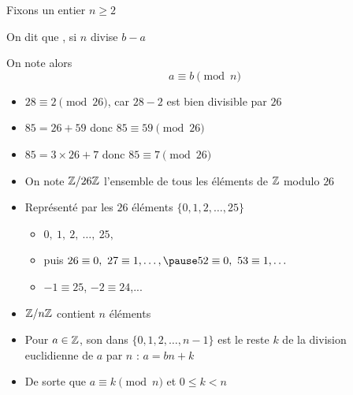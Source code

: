 \begin{frame}
Fixons un entier $n \ge 2$
\begin{mydefinition}
 On dit que ,
si $n$ divise $b-a$

\pause

On note alors 
\vspace*{-3ex}
$$a \equiv b \pmod n $$ %
\vspace*{-4ex}
\end{mydefinition}

\pause

\begin{itemize}
  \item $28 \equiv  2 \pmod {26}$\pause, car $28-2$ est bien divisible par $26$
\pause  
  \item $85 = 26+ 59$ donc $85 \equiv  59 \pmod {26}$
\pause  
  \item $85 = 3 \times 26+ 7$ donc $85 \equiv  7 \pmod {26}$
\pause
  \item On note $\mathbb{Z}/26 \mathbb{Z}$ l'ensemble de tous les éléments de $\mathbb{Z}$ modulo $26$
\pause  
  \item Représenté par les $26$ éléments $\{0,1,2,\ldots, 25\}$
\pause
        \begin{itemize}         
          \item $0,\ 1,\ 2,\ \ldots,\  25,$
                \pause 
                \item   puis  $26 \equiv 0,\  27 \equiv 1,  \ldots, \pause 52\equiv0,\  53\equiv1, \ldots$
          \pause    
            \item $-1\equiv25$, $-2\equiv24$,...
            \end{itemize}
\end{itemize}

\pause
\medskip
\begin{itemize}
  \item $\mathbb{Z} / n \mathbb{Z}$ contient $n$ éléments
\pause  
  \item Pour $a \in \mathbb{Z}$, son  dans $\{0,1,2,\ldots, n-1\}$ est le reste $k$
de la division euclidienne de $a$ par $n$ : $a = bn + k$
\pause
  \item De sorte que $a \equiv  k \pmod n$ et $0 \le k < n$ 
\end{itemize}

\end{frame}


